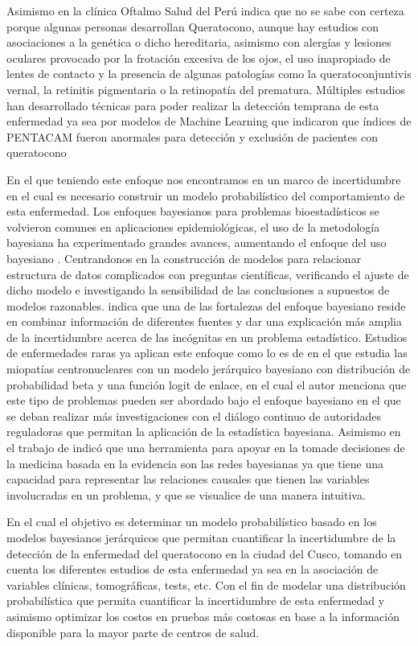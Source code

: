 Asimismo en la clínica Oftalmo Salud del Perú indica que no se sabe con certeza porque algunas personas desarrollan Queratocono, aunque hay estudios con asociaciones a la genética o dicho hereditaria, asimismo con alergías y lesiones oculares provocado por la frotación excesiva de los ojos, el uso inapropiado de lentes de contacto y la presencia de algunas patologías como la queratoconjuntivis vernal, la retinitis pigmentaria o la retinopatía del prematura. Múltiples estudios han desarrollado técnicas para poder realizar la detección temprana de esta enfermedad ya sea por modelos de Machine Learning que indicaron que índices de PENTACAM fueron anormales para detección y exclusión de pacientes con queratocono \cite{zhao2024evaluation}

En el que teniendo este enfoque nos encontramos en un marco de incertidumbre en el cual es necesario construir un modelo probabilístico del comportamiento de esta enfermedad. Los enfoques bayesianos para problemas bioestadísticos se volvieron comunes en aplicaciones epidemiológicas, el uso de la metodología bayesiana ha experimentado grandes avances, aumentando el enfoque del uso bayesiano \cite{lawson2018bayesian}. Centrandonos en la construcción de modelos para relacionar estructura de datos complicados con preguntas científicas, verificando el ajuste de dicho modelo e investigando la sensibilidad de las conclusiones a supuestos de modelos razonables. \cite{Gelman_2013} indica que una de las fortalezas del enfoque bayesiano reside en combinar información de diferentes fuentes y dar una explicación más amplia de la incertidumbre acerca de las incógnitas en un problema estadístico.
Estudios de enfermedades raras ya aplican este enfoque como lo es de \cite{fouarge2021hierarchical} en el que estudia las miopatías centronucleares con un modelo jerárquico bayesiano con distribución de probabilidad beta y una función logit de enlace, en el cual el autor menciona que este tipo de problemas pueden ser abordado bajo el enfoque bayesiano en el que se deban realizar más investigaciones con el diálogo continuo de autoridades reguladoras que permitan la aplicación de la estadística bayesiana. Asimismo en el trabajo de \cite{ferez2017redes} indicó que una herramienta para apoyar en la tomade decisiones de la medicina basada en la evidencia son las redes bayesianas ya que tiene una capacidad para representar las relaciones causales que tienen las variables involucradas en un problema, y que se visualice de una manera intuitiva.

En el cual el objetivo es determinar un modelo probabilístico basado en los modelos bayesianos jerárquicos que permitan cuantificar la incertidumbre de la detección de la enfermedad del queratocono en la ciudad del Cusco, tomando en cuenta los diferentes estudios de esta enfermedad ya sea en la asociación de variables clínicas, tomográficas, tests, etc. Con el fin de modelar una distribución probabilística que permita cuantificar la incertidumbre de esta enfermedad y asimismo optimizar los costos en pruebas más costosas en base a la información disponible para la mayor parte de centros de salud.


